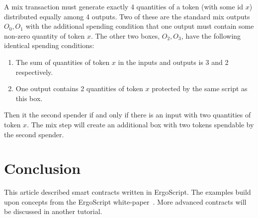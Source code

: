\documentclass[11pt]{article}
\newcommand{\langname}{ErgoScript\xspace}
\begin{document}
\begin{enumerate}
A mix transaction must generate exactly 4 quantities of a token (with some id $x$) distributed equally among 4 outputs. Two of these are the standard mix outputs $O_0, O_1$ with the additional spending condition that one output must contain some non-zero quantity of token $x$. The other two boxes, $O_2, O_3$, have the following identical spending conditions:
\begin{enumerate}
	\item The sum of quantities of token $x$ in the inputs and outputs is 3 and 2 respectively.
	\item One output contains 2 quantities of token $x$ protected by the same script as this box. 
\end{enumerate}

Then it the second spender if and only if there is an input with two quantities of token $x$. 
The mix step will create an additional box with two tokens spendable by the second spender.
\end{enumerate}

 

\section{Conclusion}

This article described smart contracts written in \langname. The examples build upon concepts from the \langname white-paper~\cite{whitepaper}. More advanced contracts will be discussed in another tutorial.



\end{document}
